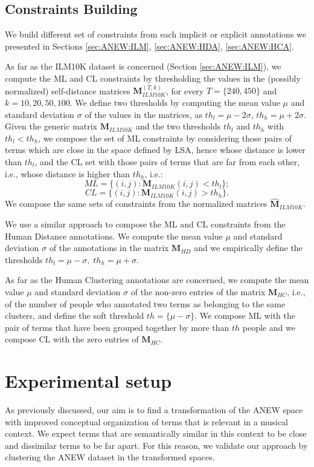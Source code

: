 \subsection{Constraints Building}
\label{sec:ANEW:constraints}
We build different set of constraints from each implicit or explicit annotations we presented in Sections \ref{sec:ANEW:ILM}, \ref{sec:ANEW:HDA}, \ref{sec:ANEW:HCA}. 

As far as the ILM10K dataset is concerned (Section \ref{sec:ANEW:ILM}), we compute the ML and CL constraints by thresholding the values in the (possibly normalized) self-distance matrices $\mathbf{M}_{ILM10K}^{(T,k)}$, for every $T=\{240,450\}$ and $k=10,20,50,100$. We define two thresholds by computing the mean value $\mu$ and standard deviation $\sigma$ of the values in the matrices, as $th_l= \mu - 2 \sigma $, $th_h= \mu + 2 \sigma $. 
Given the generic matrix $\mathbf{M}_{ILM10K}$ and the two thresholds $th_l$ and $th_h$ with $th_l<th_h$, we compose the set of ML constraints by considering those pairs of terms which are close in the space defined by LSA, hence whose distance is lower than $th_l$, and the CL set with those pairs of terms that are far from each other, i.e., whose distance is higher than $th_h$, i.e.:
\begin{equation}
ML=\{ (i, j) : \mathbf{M}_{ILM10K}(i,j)<th_l    \};
\end{equation}
\begin{equation}
CL=\{ (i, j) : \mathbf{M}_{ILM10K}(i,j)>th_h    \}.
\end{equation}
We compose the same sets of constraints from the normalized matrices $\mathbf{\hat{M}}_{ILM10K}$.

We use a similar approach to compose the ML and CL constraints from the Human Distance annotations. We compute the mean value $\mu$ and standard deviation $\sigma$ of the annotations in the matrix $\mathbf{M}_{HD}$ and we empirically define the thresholds $th_l=\mu - \sigma,\; th_h=\mu + \sigma$. 

As far as the Human Clustering annotations are concerned, we compute the mean value $\mu$ and standard deviation $\sigma$ of the non-zero entries of the matrix $\mathbf{M}_{HC}$, i.e., of the number of people who annotated two terms as belonging to the same clusters, and define the soft threshold $th= \{\mu - \sigma \}$. We compose ML with the pair of terms that have been grouped together by more than $th$ people and we compose CL with the zero entries of $\mathbf{M}_{HC}$.


\section{Experimental setup}
\label{sec:ANEW:results}
As previously discussed, our aim is to find a transformation of the ANEW space with improved conceptual organization of terms that is relevant in a musical context. We expect terms that are semantically similar in this context to be close and dissimilar terms to be far apart. For this reason, we validate our approach by clustering the ANEW dataset in the transformed spaces. 

